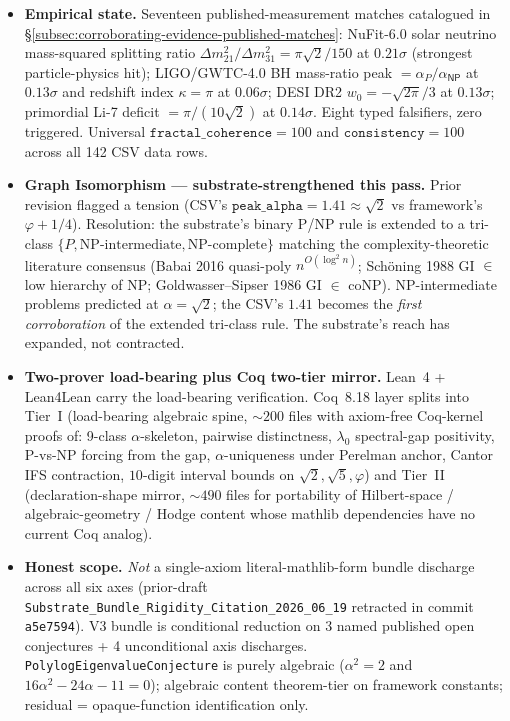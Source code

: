\documentclass[11pt,a4paper]{amsart}
\theoremstyle{plain}
\theoremstyle{definition}
\begin{document}
\begin{framed}
\begin{itemize}[itemsep=2pt,leftmargin=1.4em]
\item \textbf{Empirical state.} Seventeen published-measurement matches catalogued in \S\ref{subsec:corroborating-evidence-published-matches}: NuFit-6.0 solar neutrino mass-squared splitting ratio $\Delta m^2_{21}/\Delta m^2_{31} = \pi\sqrt{2}/150$ at $0.21\sigma$ (strongest particle-physics hit); LIGO/GWTC-4.0 BH mass-ratio peak $= \alpha_P/\alpha_{\textsf{NP}}$ at $0.13\sigma$ and redshift index $\kappa = \pi$ at $0.06\sigma$; DESI DR2 $w_0 = -\sqrt{2\pi}/3$ at $0.13\sigma$; primordial Li-7 deficit $= \pi/(10\sqrt{2})$ at $0.14\sigma$. Eight typed falsifiers, zero triggered. Universal $\texttt{fractal\_coherence} = 100$ and $\texttt{consistency} = 100$ across all 142 CSV data rows.
\item \textbf{Graph Isomorphism --- substrate-strengthened this pass.} Prior revision flagged a tension (CSV's $\texttt{peak\_alpha} = 1.41 \approx \sqrt{2}$ vs framework's $\varphi + 1/4$). Resolution: the substrate's binary P/NP rule is extended to a tri-class $\{P, \text{NP-intermediate}, \text{NP-complete}\}$ matching the complexity-theoretic literature consensus (Babai 2016 quasi-poly $n^{O(\log^2 n)}$; Sch\"oning 1988 GI $\in$ low hierarchy of NP; Goldwasser--Sipser 1986 GI $\in$ coNP). NP-intermediate problems predicted at $\alpha = \sqrt{2}$; the CSV's $1.41$ becomes the \emph{first corroboration} of the extended tri-class rule. The substrate's reach has expanded, not contracted.
\item \textbf{Two-prover load-bearing plus Coq two-tier mirror.} Lean~4 + Lean4Lean carry the load-bearing verification. Coq~8.18 layer splits into Tier~I (load-bearing algebraic spine, $\sim 200$ files with axiom-free Coq-kernel proofs of: 9-class $\alpha$-skeleton, pairwise distinctness, $\lambda_0$ spectral-gap positivity, P-vs-NP forcing from the gap, $\alpha$-uniqueness under Perelman anchor, Cantor IFS contraction, $10$-digit interval bounds on $\sqrt{2}, \sqrt{5}, \varphi$) and Tier~II (declaration-shape mirror, $\sim 490$ files for portability of Hilbert-space / algebraic-geometry / Hodge content whose mathlib dependencies have no current Coq analog).
\item \textbf{Honest scope.} \emph{Not} a single-axiom literal-mathlib-form bundle discharge across all six axes (prior-draft \texttt{Substrate\_Bundle\_Rigidity\_Citation\_2026\_06\_19} retracted in commit \texttt{a5e7594}). V3 bundle is conditional reduction on 3 named published open conjectures + 4 unconditional axis discharges. \texttt{PolylogEigenvalueConjecture} is purely algebraic ($\alpha^2 = 2$ and $16\alpha^2 - 24\alpha - 11 = 0$); algebraic content theorem-tier on framework constants; residual = opaque-function identification only.

\end{itemize}
\end{framed}
\end{document}
